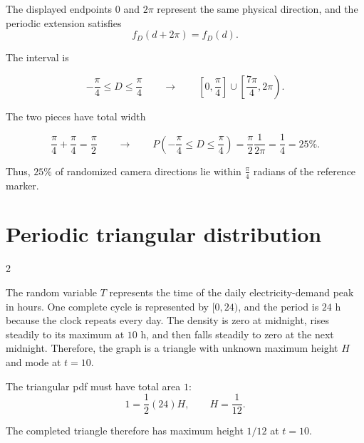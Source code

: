 	The displayed endpoints $0$ and $2\pi$ represent the same physical
	direction, and the periodic extension satisfies
	\[
	f_D(d+2\pi)=f_D(d).
	\]
	
	The interval is
	
	$$
	-\frac{\pi}{4}\le D\le\frac{\pi}{4}
	\qquad\longrightarrow\qquad
	\left[0,\frac{\pi}{4}\right]\cup\left[\frac{7\pi}{4},2\pi\right).
	$$
	
	The two pieces have total width
	
	$$
	\frac{\pi}{4}+\frac{\pi}{4}=\frac{\pi}{2}
	\qquad\longrightarrow\qquad
	P\left(-\frac{\pi}{4}\le D\le\frac{\pi}{4}\right)
	=\frac{\pi}{2}\frac1{2\pi}
	=\frac14=25\%.
	$$
	
	Thus, $25\%$ of randomized camera directions lie within $\frac{\pi}{4}$ radians of the reference marker.
	
	
	
	\section{Periodic triangular distribution}
	
	\setlength{\columnseprule}{0.4pt}
	\begin{multicols}{2}
		
		The random variable $T$ represents the time of the daily electricity-demand
		peak in hours. One complete cycle is represented by $[0,24)$, and the period
		is $24$ h because the clock repeats every day. The density is zero at
		midnight, rises steadily to its maximum at $10$ h, and then falls steadily to
		zero at the next midnight. Therefore, the graph is a triangle with unknown
		maximum height $H$ and mode at $t=10$.
		
		
		\columnbreak
		
		The triangular pdf must have total area $1$:
		\[
		1=\frac12(24)H,
		\qquad
		H=\frac1{12}.
		\]
		
		The completed triangle therefore has maximum height $1/12$ at $t=10$.
		
		
	\end{multicols}
	\setlength{\columnseprule}{0pt}
	
